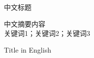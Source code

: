 \cleardoublepage 
\pagestyle{fancy}
     \fancyhf{}
	 \fancyhead[CO]{\normalfont\small\rmfamily\nouppercase{\leftmark}}
     \fancyfoot[C]{-\,\thepage\,-}
     \renewcommand{\headrulewidth}{0.4pt}

\begin{cnabstract}
\begin{center}
		\heiti {}中文标题 \\[2em]
	\end{center}
\heiti[摘要]\quad 
\songti{}
中文摘要内容
\\[2em]\heiti[关键词]\quad 
\songti{}关键词1；关键词2；关键词3\qquad 
\end{cnabstract}

\cleardoublepage 
\begin{enabstract}
\begin{center}
		\textsf{Title in English} \\[2em]
\end{center}

\end{enabstract}